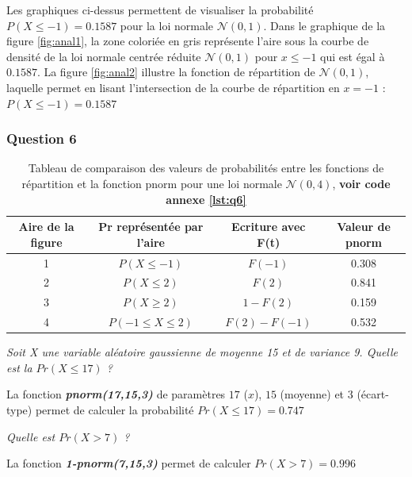             Les graphiques ci-dessus permettent de visualiser la probabilité $P(X\leq -1) = 0.1587$ pour la loi normale $\mathcal N(0,1)$.
            Dans le graphique de la figure \ref{fig:anal1}, la zone coloriée en gris représente l'aire sous la courbe de densité de la loi normale centrée réduite $\mathcal N(0,1)$ pour $x\leq -1$ qui est égal à $0.1587$.
            La figure \ref{fig:anal2} illustre la fonction de répartition de $\mathcal N(0,1)$, laquelle permet en lisant l'intersection de la courbe de répartition en $x=-1$ : $P(X\leq -1) = 0.1587$ 

        \subsubsection{Question 6}
            \begin{table}[H]
                \centering
                \begin{tabular}{|c|c|c|c|}
                    \hline
                    Aire de la figure & Pr représentée par l'aire & Ecriture avec F(t) & Valeur de pnorm \\
                    \hline
                    1 & $P(X\leq -1)$ & $F(-1)$ & 0.308 \\
                    2 & $P(X\leq 2)$ & $F(2)$ & 0.841 \\
                    3 & $P(X \geq 2)$ & $1-F(2)$ & 0.159 \\
                    4 & $P(-1 \leq X \leq 2)$ & $F(2)-F(-1)$ & 0.532 \\
                    \hline
                \end{tabular}
                \caption{Tableau de comparaison des valeurs de probabilités entre les fonctions de répartition et la fonction pnorm pour une loi normale $\mathcal N(0,4)$, \textbf{voir code annexe \ref{lst:q6}}}
                \label{tab:tab3}
            \end{table}

            \begin{center}
                \textit{Soit X une variable aléatoire gaussienne de moyenne 15 et de variance 9. Quelle est la  $Pr(X \leq 17)$ ?}
            \end{center}
            
            \noindent La fonction \textbf{\textit{pnorm(17,15,3)}} de paramètres $17$ ($x$), $15$ (moyenne) et $3$ (écart-type) permet de calculer la probabilité $Pr(X \leq 17)= 0.747$

            \begin{center}
                \textit{Quelle est $Pr(X>7)$ ?}
            \end{center}
            \noindent La fonction \textbf{\textit{1-pnorm(7,15,3)}} permet de calculer $Pr(X>7)= 0.996$


